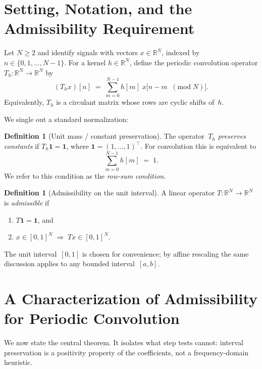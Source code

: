\documentclass[11pt,a4paper]{article}
\theoremstyle{plain}
\theoremstyle{definition}
\newtheorem{definition}[theorem]{Definition}
\theoremstyle{plain}
\newcommand{\R}{\mathbb{R}}
\newcommand{\one}{\mathbf{1}}
\begin{document}
\section{Setting, Notation, and the Admissibility Requirement}
\label{sec:setting}

Let $N \ge 2$ and identify signals with vectors $x \in \R^N$, indexed by
$n \in \{0,1,\dots,N-1\}$.  For a kernel $h \in \R^N$, define the periodic
convolution operator $T_h : \R^N \to \R^N$ by
\begin{equation}\label{eq:conv}
  (T_h x)[n]
  \;=\;
  \sum_{m=0}^{N-1} h[m]\; x\bigl[n - m \;\;(\mathrm{mod}\; N)\bigr].
\end{equation}
Equivalently, $T_h$ is a circulant matrix whose rows are cyclic shifts of~$h$.

We single out a standard normalization:

\begin{definition}[Unit mass / constant preservation]
\label{def:unit-mass}
The operator~$T_h$ \emph{preserves constants} if $T_h \one = \one$, where
$\one = (1,\dots,1)^\top$.  For convolution this is equivalent to
\[
  \sum_{m=0}^{N-1} h[m] \;=\; 1.
\]
We refer to this condition as the \emph{row-sum condition}.
\end{definition}

\begin{definition}[Admissibility on the unit interval]
\label{def:admissibility}
A linear operator $T : \R^N \to \R^N$ is \emph{admissible} if
\begin{enumerate}[label=(\roman*)]
  \item $T\one = \one$, and
  \item $x \in [0,1]^N \;\Longrightarrow\; Tx \in [0,1]^N$.
\end{enumerate}
\end{definition}

\noindent
The unit interval~$[0,1]$ is chosen for convenience; by affine rescaling the
same discussion applies to any bounded interval~$[a,b]$.


\section{A Characterization of Admissibility for Periodic Convolution}
\label{sec:characterization}

We now state the central theorem.  It isolates what step tests cannot: interval
preservation is a positivity property of the coefficients, not a
frequency-domain heuristic.
\end{document}
